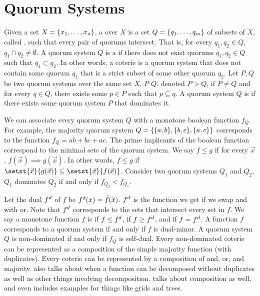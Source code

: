 \section{Quorum Systems}
Given a set $X = \{x_1, \ldots, x_n\}$, a  over $X$ is
a set $Q = \{q_1, \ldots, q_m\}$ of subsets of $X$, called ,
such that every pair of quorums intersect. That is, for every $q_1, q_2 \in
Q$, $q_1 \cap q_2 \neq \emptyset$.
%
A quorum system $Q$ is a  if there does not exist quorums
$q_1, q_2 \in Q$ such that $q_1 \subset q_2$. In other words, a coterie is a
quorum system that does not contain some quorum $q_1$ that is a strict subset
of some other quorum $q_2$.
%
Let $P, Q$ be two quorum systems over the same set $X$. $P$ 
$Q$, denoted $P > Q$, if $P \neq Q$ and for every $q \in Q$, there exists some
$p \in P$ such that $p \subseteq q$. A quorum system $Q$ is 
if there exists some quorum system $P$ that dominates it.

We can associate every quorum system $Q$ with a monotone boolean function
$f_Q$. For example, the majority quorum system $Q = \{\{a, b\}, \{b,
c\}, \{a, c\}\}$ corresponds to the function $f_Q = ab + bc + ac$. The prime
implicants of the boolean function correspond to the minimal sets of the quorum
system. We say $f \leq g$ if for every $\vec{x}$, $f(\vec{x}) \implies
g(\vec{x})$. In other words, $f \leq g$ if $\setst{\vec{x}}{g(\vec{x})}
\subseteq \setst{\vec{x}}{f(\vec{x})}$. Consider two quorum systems $Q_1$ and
$Q_2$, $Q_1$ dominates $Q_2$ if and only if $f_{Q_2} < f_{Q_1}$.

Let the dual $f^d$ of $f$ be $f^d(x) = \bar{f}(\bar{x})$. $f^d$
is the function we get if we swap and with or. Note that $f^d$ corresponds
to the sets that intersect every set in $f$. We say a monotone function $f$
is  if $f \leq f^d$,  if $f \geq
f^d$, and  if $f = f^d$. A function $f$
corresponds to a quorum system if and only if $f$ is dual-minor.  A quorum
system $Q$ is non-dominated if and only if $f_Q$ is self-dual. Every
non-dominated coterie can be represented as a composition of the simple
majority function (with duplicates). Every coterie can be represented by a
composition of and, or, and majority. \cite{ibaraki1993theory} also talks about
when a function can be decomposed without duplicates as well as other things
involving decomposition. \cite{neilsen1991general} talks about composition as
well, and even includes examples for things like grids and trees.

